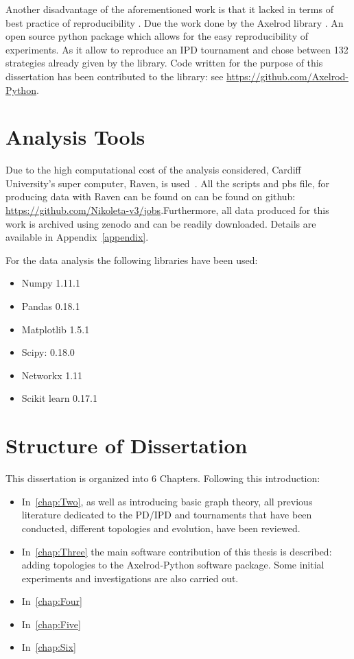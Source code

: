 Another disadvantage of the aforementioned work is that it lacked in terms of
best practice of reproducibility \cite{Axelrod1980a,Axelrod1980b,Stephens2002,Chong2004,Stewart2013}.
Due the work done by the Axelrod library \cite{axelrodproject}.
An open source python package which allows for the easy
reproducibility of experiments. As it allow to reproduce an IPD tournament and
chose between 132 strategies already given by the library. Code written for the
purpose of this dissertation has been contributed to the library: see
\url{https://github.com/Axelrod-Python}.

\section{Analysis Tools}
Due to the high computational cost of the analysis considered, Cardiff
University's super computer, Raven, is used~\cite{raven}. All the scripts and pbs
file, for producing data with Raven can be found on can be found on github:
\url{https://github.com/Nikoleta-v3/jobs}.Furthermore, all data produced for
this work is archived using zenodo and can be readily downloaded. Details are
available in Appendix~\ref{appendix}.

For the data analysis the following libraries have been used:

\begin{multicols}{2}
	\begin{itemize}
		\item Numpy 1.11.1~\cite{numpy}
		\item Pandas 0.18.1~\cite{pandas}
		\item Matplotlib 1.5.1~\cite{matplot}
		\item Scipy: 0.18.0~\cite{scipy}
		\item Networkx 1.11~\cite{networkx}
    \item Scikit learn 0.17.1~\cite{scikit}
	\end{itemize}
\end{multicols}

\section{Structure of Dissertation}
This dissertation is organized into 6 Chapters. Following this introduction:
\begin{itemize}
  \item In~\autoref{chap:Two}, as well as introducing basic graph theory, all
        previous literature dedicated to the PD/IPD and tournaments that have
        been conducted, different topologies and evolution, have been reviewed.
  \item In~\autoref{chap:Three} the main software contribution of this thesis is
        described: adding topologies to the Axelrod-Python software package.
        Some initial experiments and investigations are also carried out.
  \item In~\autoref{chap:Four}
  \item In~\autoref{chap:Five}
  \item In~\autoref{chap:Six}
\end{itemize}
